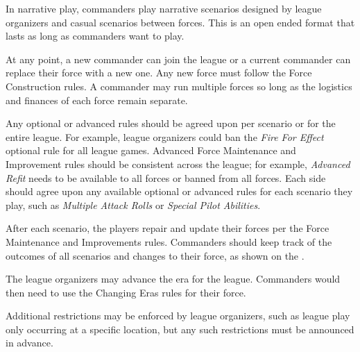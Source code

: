 In narrative play, commanders play narrative scenarios designed by league organizers and casual scenarios between forces.
This is an open ended format that lasts as long as commanders want to play.

At any point, a new commander can join the league or a current commander can replace their force with a new one.
Any new force must follow the Force Construction rules.
A commander may run multiple forces so long as the logistics and finances of each force remain separate.

Any optional or advanced rules should be agreed upon per scenario or for the entire league.
For example, league organizers could ban the \emph{Fire For Effect} optional rule for all league games.
Advanced Force Maintenance and Improvement rules should be consistent across the league; for example, \emph{Advanced Refit} needs to be available to all forces or banned from all forces.
Each side should agree upon any available optional or advanced rules for each scenario they play, such as \emph{Multiple Attack Rolls} or \emph{Special Pilot Abilities}.

After each scenario, the players repair and update their forces per the Force Maintenance and Improvements rules.
Commanders should keep track of the outcomes of all scenarios and changes to their force, as shown on the .

The league organizers may advance the era for the league.
Commanders would then need to use the Changing Eras rules for their force.

Additional restrictions may be enforced by league organizers, such as league play only occurring at a specific location, but any such restrictions must be announced in advance.
